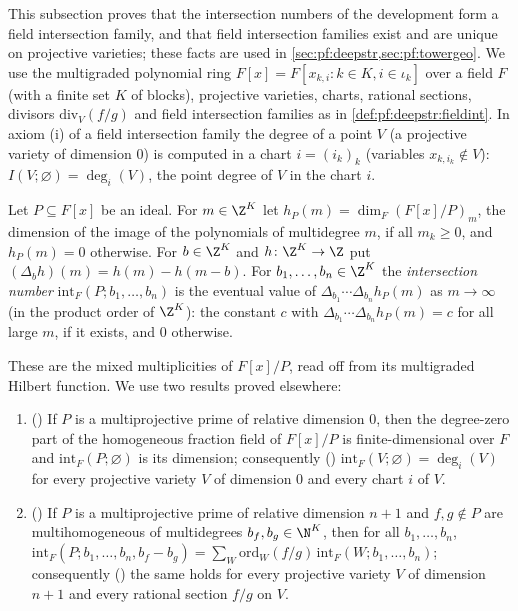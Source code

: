 This subsection proves that the intersection numbers of the development form a field intersection family, and that field intersection
families exist and are unique on projective varieties; these facts are used in \cref{sec:pf:deepstr,sec:pf:towergeo}. We use the
multigraded polynomial ring $F[x]=F[x_{k,i}:k\in K,i\in\iota_k]$ over a field $F$ (with a finite set $K$ of blocks), projective varieties,
charts, rational sections, divisors $\mathrm{div}_V(f/g)$ and field intersection families as in \cref{def:pf:deepstr:fieldint}. In axiom (i)
of a field intersection family the degree of a point $V$ (a projective variety of dimension $0$) is computed in a chart $i=(i_k)_k$
(variables $x_{k,i_k}\notin V$): $I(V;\varnothing)=\deg_i(V)$, the point degree of $V$ in the chart $i$.

\begin{definition}\label{pf:sh-misc:intnumdef}
Let $P\subseteq F[x]$ be an ideal. For $m\in\Z^K$ let $h_P(m)=\dim_F(F[x]/P)_m$, the dimension of the image of the polynomials of
multidegree $m$, if all $m_k\ge0$, and $h_P(m)=0$ otherwise. For $b\in\Z^K$ and $h\colon\Z^K\to\Z$ put $(\Delta_bh)(m)=h(m)-h(m-b)$.
For $b_1,\dots,b_n\in\Z^K$ the \emph{intersection number} $\mathrm{int}_F(P;b_1,\dots,b_n)$ is the eventual value of
$\Delta_{b_1}\cdots\Delta_{b_n}h_P(m)$ as $m\to\infty$ (in the product order of $\Z^K$): the constant $c$ with
$\Delta_{b_1}\cdots\Delta_{b_n}h_P(m)=c$ for all large $m$, if it exists, and $0$ otherwise.
\end{definition}

These are the mixed multiplicities of $F[x]/P$, read off from its multigraded Hilbert function.
We use two results proved elsewhere:
\begin{enumerate}[label=(\alph*)]
\item () If $P$ is a multiprojective prime of relative dimension $0$,
then the degree-zero part of the homogeneous fraction field of $F[x]/P$ is finite-dimensional over $F$ and $\mathrm{int}_F(P;\varnothing)$
is its dimension; consequently () $\mathrm{int}_F(V;\varnothing)=
\deg_i(V)$ for every projective variety $V$ of dimension $0$ and every chart $i$ of $V$.
\item () If $P$ is a multiprojective prime of relative dimension $n+1$
and $f,g\notin P$ are multihomogeneous of multidegrees $b_f,b_g\in\N^K$, then for all $b_1,\dots,b_n$,
$\mathrm{int}_F(P;b_1,\dots,b_n,b_f-b_g)=\sum_W\mathrm{ord}_W(f/g)\,\mathrm{int}_F(W;b_1,\dots,b_n)$; consequently
() the same holds for every projective variety $V$ of
dimension $n+1$ and every rational section $f/g$ on $V$.
\end{enumerate}


